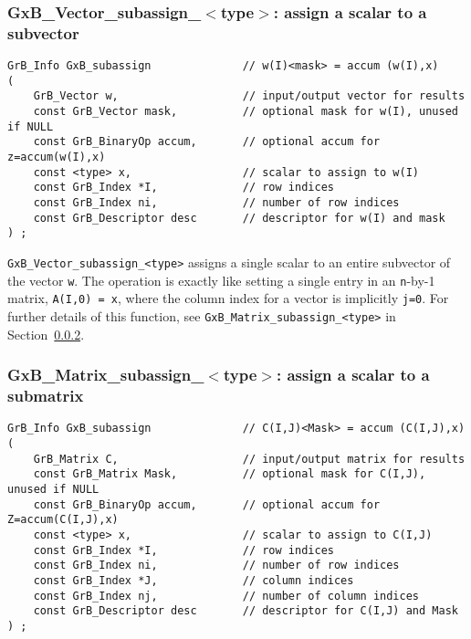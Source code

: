\documentclass[12pt]{article}
\begin{document}
{%
\subsubsection{{\sf GxB\_Vector\_subassign\_$<$type$>$:} assign a scalar to a subvector}
\label{subassign_vector_scalar}

\begin{mdframed}[userdefinedwidth=6in]
{\footnotesize
\begin{verbatim}
GrB_Info GxB_subassign              // w(I)<mask> = accum (w(I),x)
(
    GrB_Vector w,                   // input/output vector for results
    const GrB_Vector mask,          // optional mask for w(I), unused if NULL
    const GrB_BinaryOp accum,       // optional accum for z=accum(w(I),x)
    const <type> x,                 // scalar to assign to w(I)
    const GrB_Index *I,             // row indices
    const GrB_Index ni,             // number of row indices
    const GrB_Descriptor desc       // descriptor for w(I) and mask
) ;
\end{verbatim} } \end{mdframed}

\verb'GxB_Vector_subassign_<type>' assigns a single scalar to an entire
subvector of the vector \verb'w'.  The operation is exactly like setting a
single entry in an \verb'n'-by-1 matrix, \verb'A(I,0) = x', where the column
index for a vector is implicitly \verb'j=0'.  For further details of this
function, see \verb'GxB_Matrix_subassign_<type>' in
Section~\ref{subassign_matrix_scalar}.

\newpage
\subsubsection{{\sf GxB\_Matrix\_subassign\_$<$type$>$:} assign a scalar to a submatrix}
\label{subassign_matrix_scalar}

\begin{mdframed}[userdefinedwidth=6in]
{\footnotesize
\begin{verbatim}
GrB_Info GxB_subassign              // C(I,J)<Mask> = accum (C(I,J),x)
(
    GrB_Matrix C,                   // input/output matrix for results
    const GrB_Matrix Mask,          // optional mask for C(I,J), unused if NULL
    const GrB_BinaryOp accum,       // optional accum for Z=accum(C(I,J),x)
    const <type> x,                 // scalar to assign to C(I,J)
    const GrB_Index *I,             // row indices
    const GrB_Index ni,             // number of row indices
    const GrB_Index *J,             // column indices
    const GrB_Index nj,             // number of column indices
    const GrB_Descriptor desc       // descriptor for C(I,J) and Mask
) ;
\end{verbatim} } \end{mdframed}

}
\end{document}
